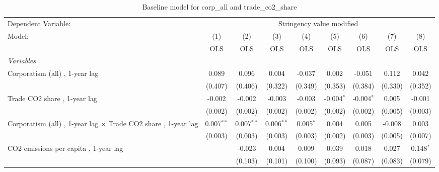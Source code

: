 
\begin{table}[htbp]
   \caption{Baseline model for corp\_all and trade\_co2\_share}
   \centering
   \begin{tabular}{lcccccccc}
      \toprule
      Dependent Variable: & \multicolumn{8}{c}{Stringency value modified}\\
      Model:                                                                & (1)          & (2)          & (3)          & (4)         & (5)          & (6)          & (7)         & (8)\\  
                                                                            &  OLS         & OLS          & OLS          & OLS         & OLS          & OLS          & OLS         & OLS\\  
      \midrule
      \emph{Variables}\\
      Corporatism (all) , 1-year lag                                        & 0.089        & 0.096        & 0.004        & -0.037      & 0.002        & -0.051       & 0.112       & 0.042\\   
                                                                            & (0.407)      & (0.406)      & (0.322)      & (0.349)     & (0.353)      & (0.384)      & (0.330)     & (0.352)\\   
      Trade CO2 share , 1-year lag                                          & -0.002       & -0.002       & -0.003       & -0.003      & -0.004$^{*}$ & -0.004$^{*}$ & 0.005       & -0.001\\   
                                                                            & (0.002)      & (0.002)      & (0.002)      & (0.002)     & (0.002)      & (0.002)      & (0.005)     & (0.003)\\   
      Corporatism (all) , 1-year lag $\times$ Trade CO2 share , 1-year lag  & 0.007$^{**}$ & 0.007$^{**}$ & 0.006$^{**}$ & 0.005$^{*}$ & 0.004        & 0.005        & -0.008      & 0.003\\   
                                                                            & (0.003)      & (0.003)      & (0.003)      & (0.003)     & (0.002)      & (0.003)      & (0.005)     & (0.007)\\   
      CO2 emissions per capita , 1-year lag                                 &              & -0.023       & 0.004        & 0.009       & 0.039        & 0.018        & 0.027       & 0.148$^{*}$\\   
                                                                            &              & (0.103)      & (0.101)      & (0.100)     & (0.093)      & (0.087)      & (0.083)     & (0.079)\\   

\end{tabular}
\end{table}
